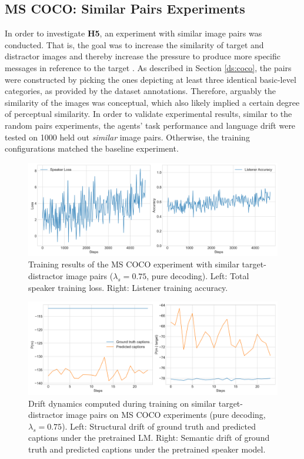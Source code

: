 \subsection{MS COCO: Similar Pairs Experiments}
\label{expt:coco_similar_pairs}
In order to investigate \textbf{H5}, an experiment with similar image pairs was conducted. That is, the goal was to increase the similarity of target and distractor images and thereby increase the pressure to produce more specific messages in reference to the target \parencite[cf.][]{graf2016animal}. As described in Section \ref{ds:coco}, the pairs were constructed by picking the ones depicting at least three identical basic-level categories, as provided by the dataset annotations. Therefore, arguably the similarity of the images was conceptual, which also likely implied a certain degree of perceptual similarity. In order to validate experimental results, similar to the random pairs experiments, the agents' task performance and language drift were tested on 1000 held out \emph{similar} image pairs. 
Otherwise, the training configurations matched the baseline experiment. 

\begin{figure}[h]
	\centering
	\includegraphics[width=\linewidth]{images/coco_similarFixed_075_losses.png}
	\caption{Training results of the MS COCO experiment with similar target-distractor image pairs ($\lambda_s=0.75$, pure decoding). Left: Total speaker training loss. Right: Listener training accuracy.}
	\label{fig:coco_similar_speaker_loss_listener_acc_all}
\end{figure}

\begin{figure}[h]
	\centering
	\includegraphics[width=\linewidth]{images/coco_structural_semantic_drift_4000_pure_075_similarFixed.png}
	\caption{Drift dynamics computed during training on similar target-distractor image pairs on MS COCO experiments (pure decoding, $\lambda_s=0.75$). Left: Structural drift of ground truth and predicted captions under the pretrained LM. Right: Semantic drift of ground truth and predicted captions under the pretrained speaker model.}
	\label{fig:coco_similar_str_sem_drift_all}
\end{figure}

